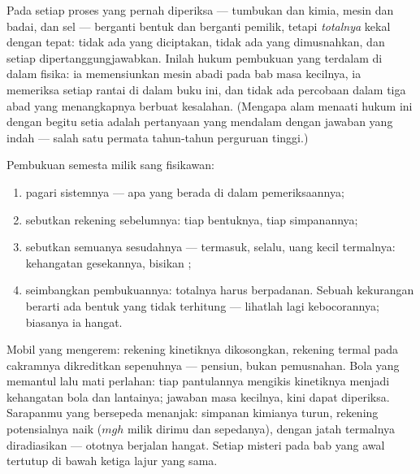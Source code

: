 \begin{proposition}\label{prop:g9:energy-conversions:conservation}
Pada setiap proses yang pernah diperiksa --- tumbukan dan kimia, mesin
dan badai,  dan sel ---  berganti bentuk dan berganti
pemilik, tetapi \emph{totalnya} kekal dengan tepat: tidak ada yang
diciptakan, tidak ada yang dimusnahkan, dan setiap 
dipertanggungjawabkan. Inilah hukum pembukuan yang terdalam di dalam
fisika: ia memensiunkan mesin abadi pada bab masa kecilnya, ia
memeriksa setiap rantai di dalam buku ini, dan tidak ada percobaan
dalam tiga abad yang menangkapnya berbuat kesalahan. (Mengapa alam
menaati hukum ini dengan begitu setia adalah pertanyaan yang mendalam
dengan jawaban yang indah --- salah satu permata tahun-tahun perguruan
tinggi.)
\end{proposition}

\begin{method}\label{met:g9:energy-conversions:audit}
Pembukuan semesta milik sang fisikawan:
\begin{enumerate}
  \item pagari sistemnya --- apa yang berada di dalam pemeriksaannya;
  \item sebutkan rekening  sebelumnya: tiap bentuknya, tiap
        simpanannya;
  \item sebutkan semuanya sesudahnya --- termasuk, selalu, uang kecil
        termalnya: kehangatan gesekannya, bisikan ;
  \item seimbangkan pembukuannya: totalnya harus berpadanan. Sebuah
        kekurangan berarti ada bentuk yang tidak terhitung ---
        lihatlah lagi kebocorannya; biasanya ia hangat.
\end{enumerate}
\end{method}

\begin{example}\label{ex:g9:energy-conversions:audits}
Mobil yang mengerem: rekening kinetiknya dikosongkan, rekening termal
pada cakramnya dikreditkan sepenuhnya --- pensiun, bukan pemusnahan.
Bola yang memantul lalu mati perlahan: tiap pantulannya mengikis
kinetiknya menjadi kehangatan bola dan lantainya; jawaban masa
kecilnya, kini dapat diperiksa. Sarapanmu yang bersepeda menanjak:
simpanan kimianya turun, rekening potensialnya naik ($m g h$ milik
dirimu dan sepedanya), dengan jatah termalnya diradiasikan --- ototnya
berjalan hangat. Setiap misteri pada bab  yang awal tertutup di
bawah ketiga lajur yang sama.
\end{example}

